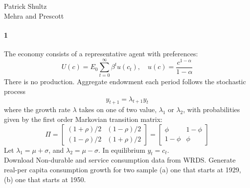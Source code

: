 \documentclass[french]{article}
\begin{document}
\noindent Patrick Shultz\\
Mehra and Prescott

\paragraph{1}
The economy consists of a representative agent with preferences:
\begin{equation*}
	U(c) = E_0 \sum_{t=0}^{\infty}\beta^tu(c_t), \quad u(c) = \frac{c^{1-\alpha}}{1-\alpha}
\end{equation*}
There is no production. Aggregate endowment each period follows the stochastic process
\begin{equation*}
	y_{t+1} = \lambda_{t+1}y_t
\end{equation*}
where the growth rate $\lambda$ takes on one of two value, $\lambda_1$ or $\lambda_2$, with probabilities given by the first order Markovian transition matrix:
\begin{equation*}
	\Pi = \begin{bmatrix} 
	(1+\rho)/2 & (1-\rho)/2\\(1-\rho)/2 & (1+\rho)/2
	\end{bmatrix}
	=\begin{bmatrix} 
	\phi & 1-\phi\\1-\phi & \phi
	\end{bmatrix}
\end{equation*}
Let $\lambda_1=\mu + \sigma$, and $\lambda_2 = \mu-\sigma$. In equilibrium $y_t = c_t$. \\

Download Non-durable and service consumption data from WRDS. Generate real-per capita consumption growth for two sample (a) one that starts at 1929, (b) one that starts at 1950. 
\end{document}
